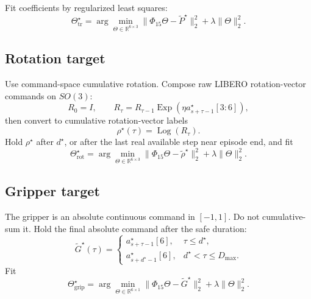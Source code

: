 \documentclass[11pt]{article}
\begin{document}
Fit coefficients by regularized least squares:
\begin{equation}
\Theta_{\mathrm{tr}}^\star
=\arg\min_{\Theta\in\mathbb{R}^{6\times 3}}
\|\Phi_{15}\Theta-\widetilde P^\star\|_2^2+\lambda\|\Theta\|_2^2.
\end{equation}

\subsection{Rotation target}
Use command-space cumulative rotation.  Compose raw LIBERO rotation-vector commands on \(SO(3)\):
\begin{equation}
R_0=I,\qquad
R_\tau=R_{\tau-1}\operatorname{Exp}(\eta a^\star_{s+\tau-1}[3:6]),
\end{equation}
then convert to cumulative rotation-vector labels
\begin{equation}
\rho^\star(\tau)=\operatorname{Log}(R_\tau).
\end{equation}
Hold \(\rho^\star\) after \(d^\star\), or after the last real available step near episode end, and fit
\begin{equation}
\Theta_{\mathrm{rot}}^\star
=\arg\min_{\Theta\in\mathbb{R}^{6\times 3}}
\|\Phi_{15}\Theta-\widetilde\rho^\star\|_2^2+\lambda\|\Theta\|_2^2.
\end{equation}

\subsection{Gripper target}
The gripper is an absolute continuous command in \([-1,1]\).  Do not cumulative-sum it.  Hold the final absolute command after the safe duration:
\begin{equation}
\widetilde G^\star(\tau)=
\begin{cases}
a^\star_{s+\tau-1}[6], & \tau\le d^\star,\\
a^\star_{s+d^\star-1}[6], & d^\star<\tau\le D_{\max}.
\end{cases}
\end{equation}
Fit
\begin{equation}
\Theta_{\mathrm{grip}}^\star
=\arg\min_{\Theta\in\mathbb{R}^{6\times 1}}
\|\Phi_{15}\Theta-\widetilde G^\star\|_2^2+\lambda\|\Theta\|_2^2.
\end{equation}
\end{document}
